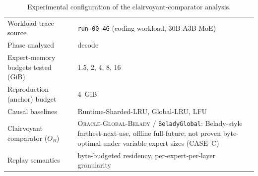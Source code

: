 \begin{table}[t]
\centering
\caption{Experimental configuration of the clairvoyant-comparator analysis.}
\label{tab:configuration}
\small
\begin{tabular}{@{}lp{7.9cm}@{}}
\toprule
Workload trace source & \texttt{run-00-4G} (coding workload, 30B-A3B MoE) \\
Phase analyzed & decode \\
Expert-memory budgets tested (GiB) & 1.5, 2, 4, 8, 16 \\
Reproduction (anchor) budget & 4~GiB \\
Causal baselines & Runtime-Sharded-LRU, Global-LRU, LFU \\
Clairvoyant comparator ($O_B$) & \textsc{Oracle-Global-Belady} / \texttt{BeladyGlobal}: Belady-style farthest-next-use, offline full-future; not proven byte-optimal under variable expert sizes (CASE~C) \\
Replay semantics & byte-budgeted residency, per-expert-per-layer granularity \\
\bottomrule
\end{tabular}
\end{table}
